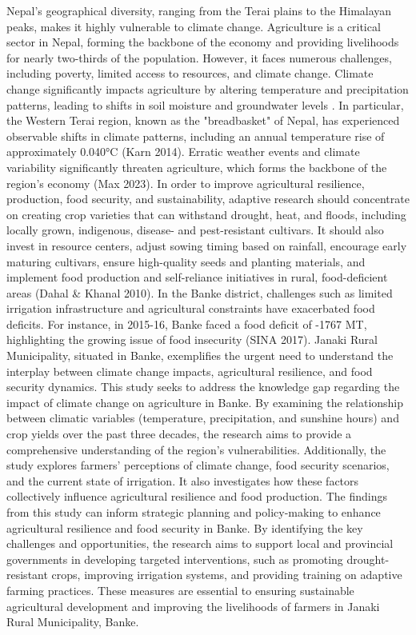 Nepal's geographical diversity, ranging from the Terai plains to the Himalayan peaks, makes it highly vulnerable to climate change. Agriculture is a critical sector in Nepal, forming the backbone of the economy and providing livelihoods for nearly two-thirds of the population. However, it faces numerous challenges, including poverty, limited access to resources, and climate change. Climate change significantly impacts agriculture by altering temperature and precipitation patterns, leading to shifts in soil moisture and groundwater levels \parencite{gyawaliOverviewAgricultureNepal2021}.
In particular, the Western Terai region, known as the "breadbasket" of Nepal, has experienced observable shifts in climate patterns, including an annual temperature rise of approximately 0.040°C (Karn 2014). Erratic weather events and climate variability significantly threaten agriculture, which forms the backbone of the region's economy (Max 2023).  In order to improve agricultural resilience, production, food security, and sustainability, adaptive research should concentrate on creating crop varieties that can withstand drought, heat, and floods, including locally grown, indigenous, disease- and pest-resistant cultivars. It should also invest in resource centers, adjust sowing timing based on rainfall, encourage early maturing cultivars, ensure high-quality seeds and planting materials, and implement food production and self-reliance initiatives in rural, food-deficient areas (Dahal \& Khanal 2010).
In the Banke district, challenges such as limited irrigation infrastructure and agricultural constraints have exacerbated food deficits. For instance, in 2015-16, Banke faced a food deficit of -1767 MT, highlighting the growing issue of food insecurity (SINA 2017). Janaki Rural Municipality, situated in Banke, exemplifies the urgent need to understand the interplay between climate change impacts, agricultural resilience, and food security dynamics. 
This study seeks to address the knowledge gap regarding the impact of climate change on agriculture in Banke. By examining the relationship between climatic variables (temperature, precipitation, and sunshine hours) and crop yields over the past three decades, the research aims to provide a comprehensive understanding of the region's vulnerabilities. Additionally, the study explores farmers' perceptions of climate change, food security scenarios, and the current state of irrigation. It also investigates how these factors collectively influence agricultural resilience and food production.
The findings from this study can inform strategic planning and policy-making to enhance agricultural resilience and food security in Banke. By identifying the key challenges and opportunities, the research aims to support local and provincial governments in developing targeted interventions, such as promoting drought-resistant crops, improving irrigation systems, and providing training on adaptive farming practices. These measures are essential to ensuring sustainable agricultural development and improving the livelihoods of farmers in Janaki Rural Municipality, Banke.
